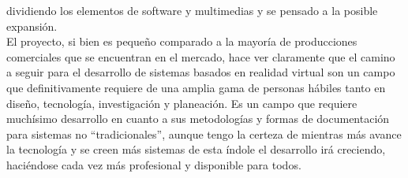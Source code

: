 dividiendo los elementos de software y multimedias y se pensado a la posible expansión.\\
El proyecto, si bien es pequeño comparado a la mayoría de producciones comerciales que se encuentran en el mercado, hace ver claramente que el camino 
a seguir para el desarrollo de sistemas basados en realidad virtual son un campo que definitivamente requiere de una amplia gama de personas hábiles tanto 
en diseño, tecnología, investigación y planeación. Es un campo que requiere muchísimo desarrollo en cuanto a sus metodologías y formas de documentación para 
sistemas no “tradicionales”, aunque tengo la certeza de mientras más avance la tecnología y se creen más sistemas de esta índole el desarrollo irá creciendo, 
haciéndose cada vez más profesional y disponible para todos.\\

